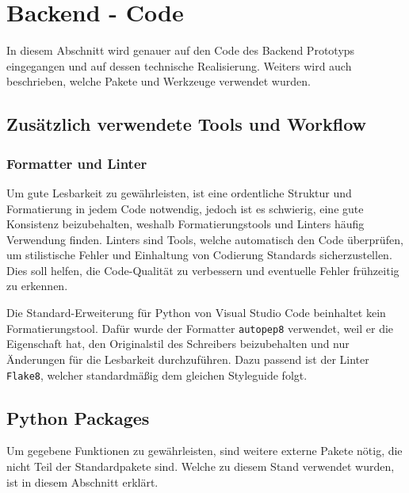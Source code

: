 \section{Backend - Code}
In diesem Abschnitt wird genauer auf den Code des Backend Prototyps eingegangen 
und auf dessen technische Realisierung. 
Weiters wird auch beschrieben, welche Pakete und Werkzeuge verwendet wurden. 

\subsection{Zusätzlich verwendete Tools und Workflow}
\subsubsection{Formatter und Linter} 
Um gute Lesbarkeit zu gewährleisten, 
ist eine ordentliche Struktur und Formatierung in jedem Code notwendig, 
jedoch ist es schwierig, eine gute Konsistenz beizubehalten, 
weshalb Formatierungstools und Linters häufig Verwendung finden. 
% 
Linters sind Tools, welche automatisch den Code überprüfen, 
um stilistische Fehler und Einhaltung von Codierung Standards sicherzustellen.
Dies soll helfen, die Code-Qualität zu verbessern 
und eventuelle Fehler frühzeitig zu erkennen.

Die Standard-Erweiterung für Python von Visual Studio Code 
beinhaltet kein Formatierungstool.
Dafür wurde der Formatter \texttt{autopep8} verwendet, 
weil er die Eigenschaft hat, den Originalstil des Schreibers beizubehalten
und nur Änderungen für die Lesbarkeit durchzuführen. 
Dazu passend ist der Linter \texttt{Flake8}, welcher standardmäßig 
dem gleichen Styleguide  folgt.


\subsection{Python Packages}
Um gegebene Funktionen zu gewährleisten, sind weitere externe Pakete nötig, 
die nicht Teil der Standardpakete sind.
Welche zu diesem Stand verwendet wurden, ist in diesem Abschnitt erklärt.

